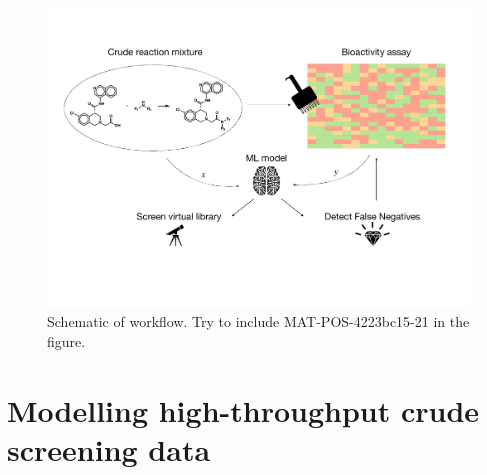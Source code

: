 
\begin{figure}[!t]
    \centering
    \includegraphics[width=\textwidth]{Chapters/Crude/Figs/schematic.pdf}
    \caption{Schematic of workflow. Try to include MAT-POS-4223bc15-21 in the figure. }
    \label{fig:schematic}
\end{figure}

\section{Modelling high-throughput crude screening data}

